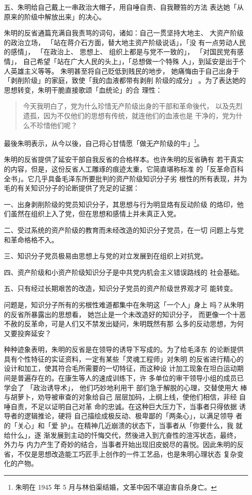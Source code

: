 五、朱明给自己戴上一串政治大帽子，用自唾自责、自我鞭笞的方法
表达她「从原来的阶级中解放出来」的决心。

朱明的反省通篇充满自我责骂的词句，诸如：自己一贯坚持大地主、
大资产阶级的政治立场，
「站在蒋介石方面，替大地主资产阶级说话」，「没
有一点劳动人民的感情」，
「在政治上、
思想上、
组织上都是与党不一致的」，
「对国民党有感情」，
自己希望「站在广大人民的头上」，「总想做一个特殊
人」，到延安是出于个人英雄主义等等。
朱明甚至将自己贬低到贱民的地步，
她痛悔由于自己出身于「剥削阶级」的家庭，致使「我的血液都带有剥削
阶级的成分」
。为了表达她的思想转变，朱明干脆直接歌颂「血统论」的合
理性：
\begin{quote}
	
{\fzwkai 今天我明白了，党为什么珍惜无产阶级出身的干部和革命後代，
以及先烈遗孤，因为不仅他们的思想有传统，就连他们的血液也是
干净的，党为什么不珍惜他们呢？} 
\end{quote}

最後朱明表示，从今以後，自己将心甘情愿「做无产阶级的牛」\footnote{朱明在 1945 年 5 月与林伯渠结婚，文革中因不堪迫害自杀身亡。}。

朱明的反省提供了延安干部自我反省的合格样本。也许朱明的反省确有
若干真实的内容，但是，这份反省人工雕琢的痕迹太重，它简直堪称标准
的「反革命百科全书」。它几乎具备毛泽东所要批判的资产阶级知识分子劣
根性的所有表现，并为毛的有关知识分子的论断提供了充足的证据：

一、出身剥削阶级的党员知识分子，其思想与行为明显烙有反动阶级
的烙印，他们虽然在组织上入了党，但在思想和感情上并未真正入党。

二、受过系统的资产阶级的教育而未经改造的知识分子党员，在一切
问题上与党和革命格格不入。

三、知识分子党员极易由思想上与党的对立发展到在组织上对抗党。

四、资产阶级和小资产阶级知识分子是中共党内机会主义错误路线的
社会基础。

五、只有经过长期艰苦的改造，知识分子党员的资产阶级世界观才可
能转变。

问题是，知识分子所有的劣根性难道都集中在朱明这「一个人」身上
吗？从朱明的反省所暴露出的思想看，
她岂止是一个未改造好的知识分子，
而更像一个十恶不赦的反革命，可是人们又不禁发出疑问，朱明既然有那
么多的反动思想，为何又要投奔延安？

种种迹象表明，朱明的反省是在领导的诱导下写成的。为了给毛泽东 的论断提供
具有个性特征的实证资料，一定有某些「灵魂工程师」对朱明 的反省进行精心的
设计和加工，使其符合毛所需要的一切特征，而这种设 计加工现象在坦白运动期
间是普遍存在的。在康生等人的速成训练下，许 多单位的审干领导小组的成员已
学会了 「政治诱导术」， 他们巧妙地利用干 部们急于解脱的心理，交替使用大
棒与胡萝卜，劝导被审查的对象给自己 层层加码，上纲上线，使他们相信，非经
自唾自责，不足以证明自己对革 命的忠诚。在这种巨大压力下，当事者只得依据
诱导者的逻辑推论，硬将 自己描绘成极反动、极卑鄙的「两条心」，以满足领导
者的「关心」和「爱 护」。在精神几近崩溃的状态下，当事者从「你要什么，我
就给什么」，逐 渐发展到主动的忏悔交代，然後进入到亢奋性的渲泻状态，最终，
外力与 内力产生了奇妙的结合，当事者开始出现旧皮蜕尽的喜悦。因此朱明的反
省，不仅是思想改造能工巧匠手上创作的一件工艺品，也是朱明心理状态 复杂变
化的产物。

